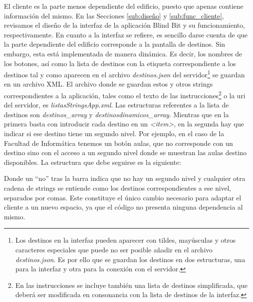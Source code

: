 El cliente es la parte menos dependiente del edificio, puesto que apenas contiene información del mismo. En las Secciones \ref{sub:diseño} y \ref{sub:func_cliente}, revisamos el diseño de la interfaz de la aplicación Blind Bit y su funcionamiento, respectivamente. En cuanto a la interfaz se refiere, es sencillo darse cuenta de que la parte dependiente del edificio corresponde a la pantalla de destinos. Sin embargo, esta está implementada de manera dinámica. Es decir, los nombres de los botones, así como la lista de destinos con la etiqueta correspondiente a los destinos tal y como aparecen en el archivo \textit{destinos.json} del servidor\footnote{Los destinos en la interfaz pueden aparecer con tildes, mayúsculas y otros caracteres especiales que puede no ser posible añadir en el archivo \textit{destinos.json}. Es por ello que se guardan los destinos en dos estructuras, una para la interfaz y otra para la conexión con el servidor.} se guardan en un archivo XML. El archivo donde se guardan estos y otros strings correspondientes a la aplicación, tales como el texto de las instrucciones\footnote{En las instrucciones se incluye también una lista de destinos simplificada, que deberá ser modificada en consonancia con la lista de destinos de la interfaz.} o la uri del servidor, es \textit{listasStringsApp.xml}. Las estructuras referentes a la lista de destinos son \textit{destinos\_array} y \textit{destinosdinamicos\_array}. Mientras que en la primera basta con introducir cada destino en un \textit{<item>}, en la segunda hay que indicar si ese destino tiene un segundo nivel. Por ejemplo, en el caso de la Facultad de Informática tenemos un botón aulas, que no corresponde con un destino sino con el acceso a un segundo nivel donde se muestran las aulas destino disponibles. La estructura que debe seguirse es la siguiente: 

 



Donde un ``no'' tras la barra indica que no hay un segundo nivel y cualquier otra cadena de strings se entiende como los destinos correspondientes a ese nivel, separados por comas. Este constituye el único cambio necesario para adaptar el cliente a un nuevo espacio, ya que el código no presenta ninguna dependencia al mismo.



